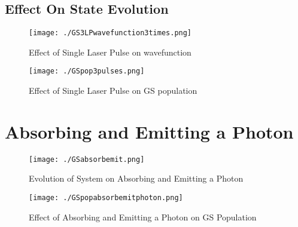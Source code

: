 \subsection{Effect On State Evolution}
\begin{figure}[H]
          \texttt{[image: ./GS3LPwavefunction3times.png]}
          \centering
          \caption{Effect of Single Laser Pulse on wavefunction}
\end{figure}


\begin{figure}[H]
          \texttt{[image: ./GSpop3pulses.png]}
          \centering
          \caption{Effect of Single Laser Pulse on GS population}
\end{figure}

\section{Absorbing and Emitting a Photon}
\begin{figure}[H]
          \texttt{[image: ./GSabsorbemit.png]}
          \centering
          \caption{Evolution of System on Absorbing and Emitting a Photon}
\end{figure}


\begin{figure}[H]
          \texttt{[image: ./GSpopabsorbemitphoton.png]}
          \centering
          \caption{Effect of Absorbing and Emitting a Photon on GS Population}
\end{figure}

